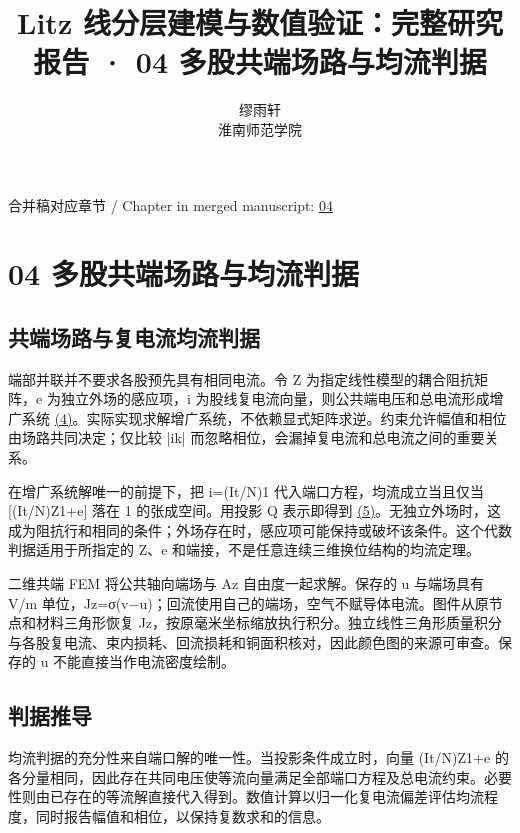 \documentclass[11pt]{article}
\begin{document}
\title{Litz 线分层建模与数值验证：完整研究报告 · 04 多股共端场路与均流判据}
\author{缪雨轩\\淮南师范学院}
\date{}
\maketitle
\noindent 合并稿对应章节 / Chapter in merged manuscript: \href{report_zh-CN_single.pdf#chapter-04}{04}\par
\FloatBarrier
\section*{04 多股共端场路与均流判据}
\hypertarget{chapter-04}{}
\subsection*{共端场路与复电流均流判据}
\hypertarget{04.common.heading}{}
端部并联并不要求各股预先具有相同电流。令 Z 为指定线性模型的耦合阻抗矩阵，e 为独立外场的感应项，i 为股线复电流向量，则公共端电压和总电流形成增广系统 \href{report_zh-CN_single.pdf#E04}{(4)}。实际实现求解增广系统，不依赖显式矩阵求逆。约束允许幅值和相位由场路共同决定；仅比较 |ik| 而忽略相位，会漏掉复电流和总电流之间的重要关系。


在增广系统解唯一的前提下，把 i=(It/N)1 代入端口方程，均流成立当且仅当 [(It/N)Z1+e] 落在 1 的张成空间。用投影 Q 表示即得到 \href{report_zh-CN_single.pdf#E05}{(5)}。无独立外场时，这成为阻抗行和相同的条件；外场存在时，感应项可能保持或破坏该条件。这个代数判据适用于所指定的 Z、e 和端接，不是任意连续三维换位结构的均流定理。


二维共端 FEM 将公共轴向端场与 Az 自由度一起求解。保存的 u 与端场具有 V/m 单位，Jz=σ(v−u)；回流使用自己的端场，空气不赋导体电流。图件从原节点和材料三角形恢复 Jz，按原毫米坐标缩放执行积分。独立线性三角形质量积分与各股复电流、束内损耗、回流损耗和铜面积核对，因此颜色图的来源可审查。保存的 u 不能直接当作电流密度绘制。


\subsection*{判据推导}
\hypertarget{04.sharing_derivation.heading}{}
均流判据的充分性来自端口解的唯一性。当投影条件成立时，向量 (It/N)Z1+e 的各分量相同，因此存在共同电压使等流向量满足全部端口方程及总电流约束。必要性则由已存在的等流解直接代入得到。数值计算以归一化复电流偏差评估均流程度，同时报告幅值和相位，以保持复数求和的信息。
\end{document}

